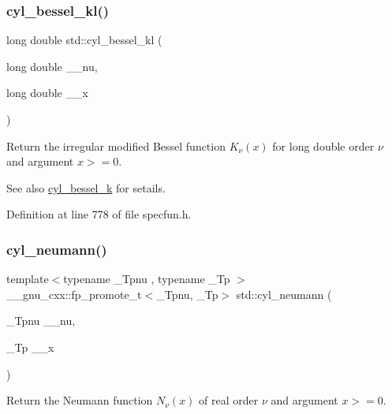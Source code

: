 \subsubsection{\texorpdfstring{cyl\+\_\+bessel\+\_\+kl()}{cyl\_bessel\_kl()}}
{\footnotesize\ttfamily long double std\+::cyl\+\_\+bessel\+\_\+kl (\begin{DoxyParamCaption}\item[{long double}]{\+\_\+\+\_\+nu,  }\item[{long double}]{\+\_\+\+\_\+x }\end{DoxyParamCaption})\hspace{0.3cm}{\ttfamily [inline]}}

Return the irregular modified Bessel function $ K_{\nu}(x) $ for {\ttfamily long double} order $ \nu $ and argument $ x >= 0 $.

\begin{DoxySeeAlso}{See also}
\hyperlink{group__tr29124__math__spec__func_gac73d664b8e7ceba7f8e786c93e97a084}{cyl\+\_\+bessel\+\_\+k} for setails. 
\end{DoxySeeAlso}


Definition at line 778 of file specfun.\+h.

\mbox{\label{group__tr29124__math__spec__func_ga1e4bef23704469b0704cf15c5f04e29e}} 
\subsubsection{\texorpdfstring{cyl\+\_\+neumann()}{cyl\_neumann()}}
{\footnotesize\ttfamily template$<$typename \+\_\+\+Tpnu , typename \+\_\+\+Tp $>$ \\
\+\_\+\+\_\+gnu\+\_\+cxx\+::fp\+\_\+promote\+\_\+t$<$\+\_\+\+Tpnu, \+\_\+\+Tp$>$ std\+::cyl\+\_\+neumann (\begin{DoxyParamCaption}\item[{\+\_\+\+Tpnu}]{\+\_\+\+\_\+nu,  }\item[{\+\_\+\+Tp}]{\+\_\+\+\_\+x }\end{DoxyParamCaption})\hspace{0.3cm}{\ttfamily [inline]}}

Return the Neumann function $ N_{\nu}(x) $ of real order $ \nu $ and argument $ x >= 0 $.

